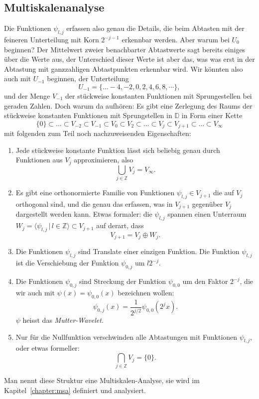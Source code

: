 \subsection{Multiskalenanalyse}
Die Funktionen $\psi_{l,j}$ erfassen also genau die Details, die beim
Abtasten mit der feineren Unterteilung mit Korn $2^{-j-1}$ erkennbar
werden.
Aber warum bei $U_0$ beginnen?
Der Mittelwert zweier benachbarter Abtastwerte sagt bereits einiges
über die Werte aus, der Unterschied dieser Werte ist aber das, was
was erst in der Abtastung mit ganzzahligen Abtastpunkten erkennbar wird.
Wir könnten also auch mit $U_{-1}$ beginnen, der Unterteilung
\[
U_{-1} = \{\dots -4,-2,0,2,4,6,8,\cdots\},
\]
und der Menge $V_{-1}$ der stückweise konstanten Funktionen mit
Sprungestellen bei geraden Zahlen.
Doch warum da aufhören: Es gibt eine Zerlegung des Raums der stückweise
konstanten Funktionen mit Sprungstellen in $\mathbb D$ in Form einer
Kette
\begin{equation}
\{0\}
\subset
\dots
\subset
V_{-2}\subset V_{-1} \subset V_{0} \subset V_{2} \subset\dots\subset
V_j \subset V_{j+1}\subset\dots \subset V_{\infty}
\label{haar:kette}
\end{equation}
mit folgenden zum Teil noch nachzuweisenden Eigenschaften:
\begin{enumerate}
\item
Jede stückweise konstante Funktion lässt sich beliebig genau
durch Funktionen aus $V_j$ approximieren, also
\[
\bigcup_{j\in\mathbb Z} V_j = V_\infty.
\]
\item
Es gibt eine orthonormierte Familie von Funktionen $\psi_{l,j}\in V_{j+1}$
die auf $V_j$ orthogonal sind, und die genau das erfassen, was in $V_{j+1}$
gegenüber $V_j$ dargestellt werden kann.
Etwas formaler: die $\psi_{l,j}$ spannen einen Unterraum
$W_{j} = \langle \psi_{l,j}\,|\, l\in\mathbb Z\rangle \subset V_{j+1}$
auf derart, dass
\[
V_{j+1} = V_j \oplus W_j.
\]
\item 
Die Funktionen $\psi_{l,j}$ sind Translate einer einzigen Funktion.
Die Funktion $\psi_{l,j}$ ist die Verschiebung der Funktion $\psi_{0,j}$ 
um $l2^{-j}$.
\item
Die Funktionen $\psi_{0,j}$ sind Streckung der Funktion
$\psi_{0,0}$ um den Faktor $2^{-j}$, die wir auch mit
$\psi(x)=\psi_{0,0}(x)$ bezeichnen wollen:
\[
\psi_{0,j}(x) = \frac1{2^{j/2}}\psi_{0,0}(2^jx).
\]
$\psi$ heisst das {\em Mutter-Wavelet}.
\item 
Nur für die Nullfunktion verschwinden alle Abtastungen mit Funktionen
$\psi_{l,j}$, oder etwas formeller:
\[
\bigcap_{j\in\mathbb Z} V_j
=
\{0\}.
\]
\end{enumerate}
Man nennt diese Struktur eine Multiskalen-Analyse, sie wird im
Kapitel~\ref{chapter:msa} definiert und analysiert.

